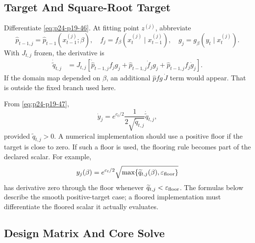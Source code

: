 \documentclass[11pt]{article}
\numberwithin{equation}{section}
\begin{document}
\subsection{Target And Square-Root Target}

Differentiate \eqref{eq:p24-p19-46}.  At fitting point \(z^{(j)}\), abbreviate
\begin{equation}
    \widehat p_{t-1,j}=\widehat p_{t-1}(x_{t-1}^{(j)};\beta),
    \quad
    f_j=f_\beta(x_t^{(j)}\mid x_{t-1}^{(j)}),
    \quad
    g_j=g_\beta(y_t\mid x_t^{(j)}).
    \label{eq:p24-p19-51}
\end{equation}
With \(J_{t,j}\) frozen, the derivative is
\begin{equation}
\begin{aligned}
    \dot{\widetilde q}_{t,j}
    &=
    J_{t,j}
    \left[
    \dot{\widehat p}_{t-1,j} f_j g_j
    +
    \widehat p_{t-1,j}\dot f_j g_j
    +
    \widehat p_{t-1,j} f_j\dot g_j
    \right].
\end{aligned}
\label{eq:p24-p19-52}
\end{equation}
If the domain map depended on \(\beta\), an additional
\(\widehat p f g\,\dot J\) term would appear.  That is outside the fixed branch
used here.

From \eqref{eq:p24-p19-47},
\begin{equation}
    \dot y_j
    =
    e^{c_t/2}
    \frac{1}{2\sqrt{\widetilde q_{t,j}}}
    \dot{\widetilde q}_{t,j},
    \label{eq:p24-p19-53}
\end{equation}
provided \(\widetilde q_{t,j}>0\).  A numerical implementation should use a
positive floor if the target is close to zero.  If such a floor is used, the
flooring rule becomes part of the declared scalar.  For example,
\begin{equation}
    y_j(\beta)
    =
    e^{c_t/2}\sqrt{\max\{\widetilde q_{t,j}(\beta),\varepsilon_{\rm floor}\}}
    \label{eq:p24-p19-53a}
\end{equation}
has derivative zero through the floor whenever
\(\widetilde q_{t,j}<\varepsilon_{\rm floor}\).  The formulas below describe
the smooth positive-target case; a floored implementation must differentiate
the floored scalar it actually evaluates.

\subsection{Design Matrix And Core Solve}
\end{document}
